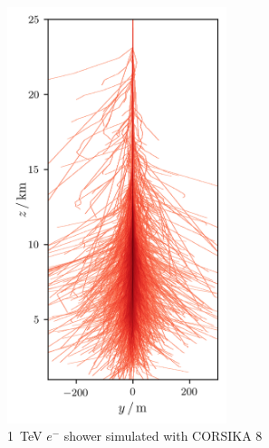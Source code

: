 \begin{frame}[c]
\begin{columns}[onlytextwidth]
\begin{column}{0.6\textwidth}
    \end{column}
        \begin{column}{0.4\textwidth}
            \begin{figure}
                \centering
                \includegraphics[width=0.6\textwidth]{plots/shower.png}
                \caption*{\SI{1}{\tera\electronvolt} $e^-$ shower simulated with CORSIKA 8}
            \end{figure}
        \end{column}
    \end{columns}
\end{frame}


